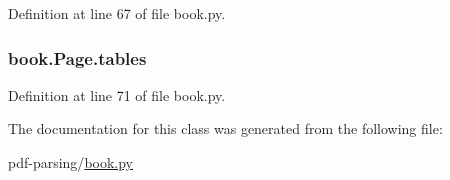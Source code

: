 Definition at line 67 of file book.\+py.

\subsubsection[{\texorpdfstring{tables}{tables}}]{\setlength{\rightskip}{0pt plus 5cm}book.\+Page.\+tables}\hypertarget{classbook_1_1_page_a8de9f5705a48c104b39f7f5c80726ead}{}\label{classbook_1_1_page_a8de9f5705a48c104b39f7f5c80726ead}


Definition at line 71 of file book.\+py.



The documentation for this class was generated from the following file\+:\begin{DoxyCompactItemize}
\item 
pdf-\/parsing/\hyperlink{book_8py}{book.\+py}\end{DoxyCompactItemize}
